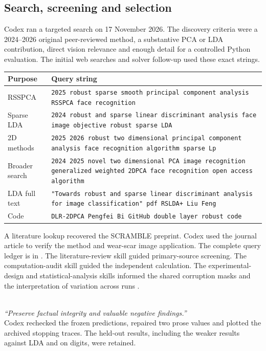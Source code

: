 \documentclass[11pt,a4paper]{article}
\newcommand{\sourcequote}[3]{%
  \par\noindent{\small\texttt{#1}}\\
  \noindent\textit{\textquotedblleft#2\textquotedblright}\\
  \noindent #3\par}
\begin{document}
\clearpage
\subsection{Search, screening and selection}
Codex ran a targeted search on 17 November 2026. The discovery criteria were a 2024--2026 original peer-reviewed method, a substantive PCA or LDA contribution, direct vision relevance and enough detail for a controlled Python evaluation. The initial web searches and solver follow-up used these exact strings.

{\small\setlength{\tabcolsep}{5pt}
\begin{tabularx}{\linewidth}{@{}P{21mm}Y@{}}
\toprule
Purpose & Query string \\
\midrule
RSSPCA & \texttt{2025 robust sparse smooth principal component analysis RSSPCA face recognition} \\
Sparse LDA & \texttt{2024 robust and sparse linear discriminant analysis face image objective robust sparse LDA} \\
2D methods & \texttt{2025 2026 robust two dimensional principal component analysis face recognition algorithm sparse Lp} \\
Broader search & \texttt{2024 2025 novel two dimensional PCA image recognition generalized weighted 2DPCA face recognition open access algorithm} \\
LDA full text & \texttt{"Towards robust and sparse linear discriminant analysis for image classification" pdf RSLDA+ Liu Feng} \\
Code & \texttt{DLR-2DPCA Pengfei Bi GitHub double layer robust code} \\
\bottomrule
\end{tabularx}}\par
A literature lookup recovered the SCRAMBLE preprint. Codex used the journal article to verify the method and wear-scar image application. The complete query ledger is in . The literature-review skill guided primary-source screening. The computation-audit skill guided the independent calculation. The experimental-design and statistical-analysis skills informed the shared corruption masks and the interpretation of variation across runs \citep{kassis2026}.

\sourcequote{02\_CRITICAL\_REVIEW\_AND\_FIGURES.md}{Preserve factual integrity and valuable negative findings.}
{Codex rechecked the frozen predictions, repaired two prose values and plotted the archived stopping traces. The held-out results, including the weaker results against LDA and on digits, were retained.}
\end{document}
